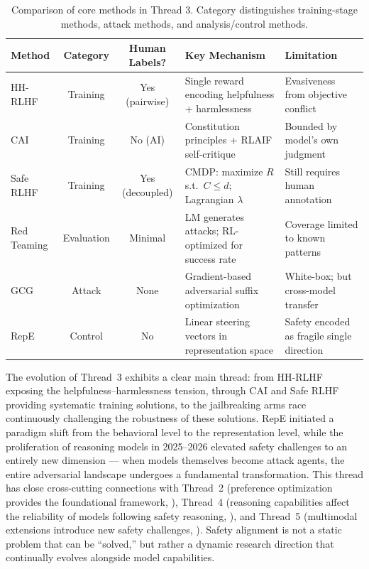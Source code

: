 \begin{table}[!ht]
\centering
\caption{Comparison of core methods in Thread 3. Category distinguishes training-stage methods, attack methods, and analysis/control methods.}
\label{tab:safety-comparison}
\small
\begin{tabularx}{\textwidth}{l c c >{\raggedright\arraybackslash}X >{\raggedright\arraybackslash}X}
\toprule
\textbf{Method} & \textbf{Category} & \textbf{Human Labels?} & \textbf{Key Mechanism} & \textbf{Limitation} \\
\midrule
HH-RLHF & Training & Yes (pairwise) & Single reward encoding helpfulness + harmlessness & Evasiveness from objective conflict \\
CAI & Training & No (AI) & Constitution principles + RLAIF self-critique & Bounded by model's own judgment \\
Safe RLHF & Training & Yes (decoupled) & CMDP: maximize $R$ s.t.\ $C \leq d$; Lagrangian $\lambda$ & Still requires human annotation \\
Red Teaming & Evaluation & Minimal & LM generates attacks; RL-optimized for success rate & Coverage limited to known patterns \\
GCG & Attack & None & Gradient-based adversarial suffix optimization & White-box; but cross-model transfer \\
RepE & Control & No & Linear steering vectors in representation space & Safety encoded as fragile single direction \\
\bottomrule
\end{tabularx}
\end{table}

The evolution of Thread~3 exhibits a clear main thread:
from HH-RLHF exposing the helpfulness--harm\-less\-ness tension,
through CAI and Safe RLHF providing systematic training solutions,
to the jailbreaking arms race continuously challenging the robustness of these solutions.
RepE initiated a paradigm shift from the behavioral level to the representation level,
while the proliferation of reasoning models in 2025--2026 elevated safety challenges to an entirely new dimension ---
when models themselves become attack agents, the entire adversarial landscape undergoes a fundamental transformation.
This thread has close cross-cutting connections with Thread~2 (preference optimization provides the foundational framework, ),
Thread~4 (reasoning capabilities affect the reliability of models following safety reasoning, ),
and Thread~5 (multimodal extensions introduce new safety challenges, ).
Safety alignment is not a static problem that can be ``solved,''
but rather a dynamic research direction that continually evolves alongside model capabilities.

